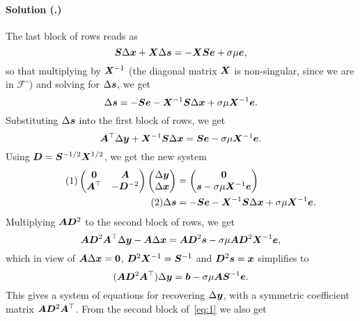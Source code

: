 \documentclass{article}
\newcounter{problemSheetNumber}
\newcounter{problems}
\renewcommand{\solution}[1]{\paragraph{Solution (\theproblemSheetNumber.\theproblems)}\addtocounter{problems}{1}\label{#1}}
\begin{document}
\solution{} The last block of rows reads as
\begin{equation*}
 \bm{S}\Delta\bm{x}+\bm{X}\Delta\bm{s}=-\bm{XS}\bm{e}+\sigma \mu \bm{e},
\end{equation*}
so that multiplying by $\bm{X}^{-1}$ (the diagonal matrix $\bm{X}$ is non-singular, since we are in $\mathcal{F}^{\circ}$) and solving for $\Delta\bm{s}$, we get
\begin{equation*}
 \Delta \bm{s} = -\bm{S}\bm{e}-\bm{X}^{-1}\bm{S}\Delta\bm{x}+\sigma \mu \bm{X}^{-1}\bm{e}.
\end{equation*}
Substituting $\Delta \bm{s}$ into the first block of rows, we get
\begin{equation*}
 \bm{A}^\top \Delta \bm{y}+\bm{X}^{-1}\bm{S}\Delta\bm{x}=\bm{S}\bm{e}-\sigma \mu \bm{X}^{-1}\bm{e}.
\end{equation*}
Using $\bm{D}=\bm{S}^{-1/2}\bm{X}^{1/2}$, we get the new system
\begin{align}\label{eq:1}\tag{1}
\begin{pmatrix}
  \bm{0} & \bm{A}\\
  \bm{A}^{\top} & -\bm{D}^{-2}
 \end{pmatrix} 
 \begin{pmatrix}
  \Delta \bm{y}\\ \Delta \bm{x}
 \end{pmatrix} &= \begin{pmatrix} \bm{0} \\ 
\bm{s}-\sigma \mu \bm{X}^{-1}\bm{e}
\end{pmatrix}\\
\label{eq:2}\tag{2}
\Delta \bm{s} &= -\bm{S}\bm{e}-\bm{X}^{-1}\bm{S}\Delta\bm{x}+\sigma \mu \bm{X}^{-1}\bm{e}.
\end{align}
Multiplying $\bm{A}\bm{D}^2$ to the second block of rows, we get
\begin{equation*}
 \bm{AD}^2\bm{A}^\top\Delta \bm{y}-\bm{A}\Delta\bm{x} = \bm{A}\bm{D}^2\bm{s}-\sigma\mu\bm{A}\bm{D}^2\bm{X}^{-1}\bm{e},
\end{equation*}
which in view of $\bm{A}\Delta\bm{x}=\bm{0}$, $\bm{D}^{2}\bm{X}^{-1}=\bm{S}^{-1}$ and $\bm{D}^2\bm{s} = \bm{x}$ simplifies to
\begin{equation*}
 (\bm{AD}^2\bm{A}^\top) \Delta \bm{y} = \bm{b}-\sigma\mu\bm{A}\bm{S}^{-1}\bm{e}.
\end{equation*}
This gives a system of equations for recovering $\Delta\bm{y}$, with a symmetric coefficient matrix $\bm{A}\bm{D}^2\bm{A}^{\top}$. From the second block of~\eqref{eq:1} we also get
\end{document}
